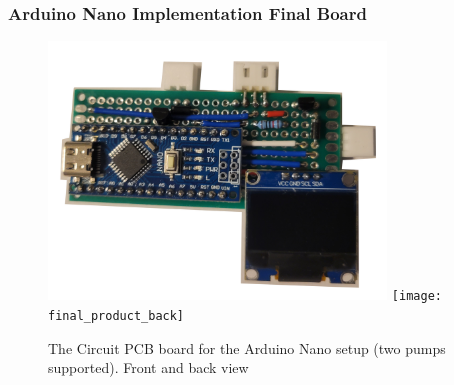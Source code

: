 \documentclass{article}
\begin{document}
		\subsubsection{Arduino Nano Implementation Final Board}
		\begin{figure}[H] 
			\centering %
			\includegraphics[width=0.8\textwidth]{final_product_front}
			\texttt{[image: final\_product\_back]}
			\caption{\footnotesize The Circuit PCB board for the Arduino Nano setup (two pumps supported). Front and back view}
			\label{fig:Arduino Nano Setup 4}
		\end{figure}
\end{document}
